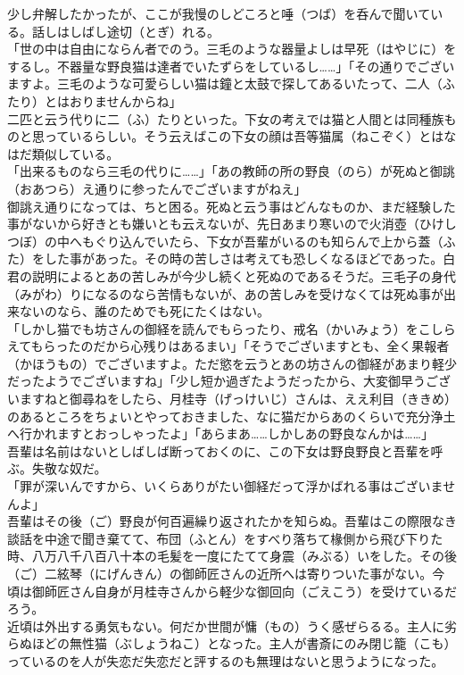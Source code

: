 \documentclass{book}
\begin{document}
少し弁解したかったが、ここが我慢のしどころと唾（つば）を呑んで聞いている。話しはしばし途切（とぎ）れる。\\
「世の中は自由にならん者でのう。三毛のような器量よしは早死（はやじに）をするし。不器量な野良猫は達者でいたずらをしているし\ldots{}\ldots{}」「その通りでございますよ。三毛のような可愛らしい猫は鐘と太鼓で探してあるいたって、二人（ふたり）とはおりませんからね」\\
二匹と云う代りに二（ふ）たりといった。下女の考えでは猫と人間とは同種族ものと思っているらしい。そう云えばこの下女の顔は吾等猫属（ねこぞく）とはなはだ類似している。\\
「出来るものなら三毛の代りに\ldots{}\ldots{}」「あの教師の所の野良（のら）が死ぬと御誂（おあつら）え通りに参ったんでございますがねえ」\\
御誂え通りになっては、ちと困る。死ぬと云う事はどんなものか、まだ経験した事がないから好きとも嫌いとも云えないが、先日あまり寒いので火消壺（ひけしつぼ）の中へもぐり込んでいたら、下女が吾輩がいるのも知らんで上から蓋（ふた）をした事があった。その時の苦しさは考えても恐しくなるほどであった。白君の説明によるとあの苦しみが今少し続くと死ぬのであるそうだ。三毛子の身代（みがわ）りになるのなら苦情もないが、あの苦しみを受けなくては死ぬ事が出来ないのなら、誰のためでも死にたくはない。\\
「しかし猫でも坊さんの御経を読んでもらったり、戒名（かいみょう）をこしらえてもらったのだから心残りはあるまい」「そうでございますとも、全く果報者（かほうもの）でございますよ。ただ慾を云うとあの坊さんの御経があまり軽少だったようでございますね」「少し短か過ぎたようだったから、大変御早うございますねと御尋ねをしたら、月桂寺（げっけいじ）さんは、ええ利目（ききめ）のあるところをちょいとやっておきました、なに猫だからあのくらいで充分浄土へ行かれますとおっしゃったよ」「あらまあ\ldots{}\ldots{}しかしあの野良なんかは\ldots{}\ldots{}」\\
吾輩は名前はないとしばしば断っておくのに、この下女は野良野良と吾輩を呼ぶ。失敬な奴だ。\\
「罪が深いんですから、いくらありがたい御経だって浮かばれる事はございませんよ」\\
吾輩はその後（ご）野良が何百遍繰り返されたかを知らぬ。吾輩はこの際限なき談話を中途で聞き棄てて、布団（ふとん）をすべり落ちて椽側から飛び下りた時、八万八千八百八十本の毛髪を一度にたてて身震（みぶる）いをした。その後（ご）二絃琴（にげんきん）の御師匠さんの近所へは寄りついた事がない。今頃は御師匠さん自身が月桂寺さんから軽少な御回向（ごえこう）を受けているだろう。\\
近頃は外出する勇気もない。何だか世間が慵（もの）うく感ぜらるる。主人に劣らぬほどの無性猫（ぶしょうねこ）となった。主人が書斎にのみ閉じ籠（こも）っているのを人が失恋だ失恋だと評するのも無理はないと思うようになった。\\
\end{document}
